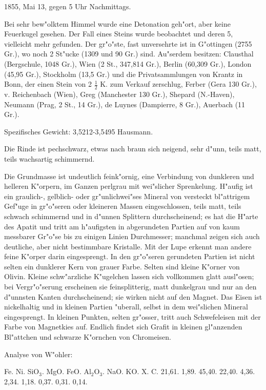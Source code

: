 \documentclass[a4paper, 11pt, oneside]{article}
\begin{document}
1855, Mai 13, gegen 5 Uhr Nachmittags.

Bei sehr bew"olktem Himmel wurde eine Detonation geh"ort, aber keine Feuerkugel gesehen. Der Fall eines Steins wurde beobachtet und deren 5, vielleicht mehr gefunden. Der gr"o"ste, fast unversehrte ist in G"ottingen (2755 Gr.), wo noch 2 St"ucke (1309 und 90 Gr.) sind. Au"serdem besitzen: Clausthal (Bergschule, 1048 Gr.), Wien (2 St., 347,814 Gr.), Berlin (60,309 Gr.), London (45,95 Gr.), Stockholm (13,5 Gr.) und die Privatsammlungen von Krantz in Bonn, der einen Stein von 2 $\frac{1}{2}$ K. zum Verkauf zerschlug, Ferber (Gera 130 Gr.), v. Reichenbach (Wien), Greg (Manchester 130 Gr.), Shepard (N.-Haven), Neumann (Prag, 2 St., 14 Gr.), de Luynes (Dampierre, 8 Gr.), Auerbach (11 Gr.).

Spezifisches Gewicht: 3,5212-3,5495 Hausmann.

Die Rinde ist pechschwarz, etwas nach braun sich neigend, sehr d"unn, teils matt, teils wachsartig schimmernd.

Die Grundmasse ist undeutlich feink"ornig, eine Verbindung von dunkleren und helleren K"orpern, im Ganzen perlgrau mit wei"slicher Sprenkelung. H"aufig ist ein graulich-, gelblich- oder gr"unlichwei"ses Mineral von versteckt bl"attrigem Gef"uge in gr"o"seren oder kleineren Massen eingeschlossen, teils matt, teils schwach schimmernd und in d"unnen Splittern durchscheinend; es hat die H"arte des Apatit und tritt am h"aufigsten in abgerundeten Partien auf von kaum messbarer Gr"o"se bis zu einigen Linien Durchmesser; manchmal zeigen sich auch deutliche, aber nicht bestimmbare Kristalle. Mit der Lupe erkennt man andere feine K"orper darin eingesprengt. In den gr"o"seren gerundeten Partien ist nicht selten ein dunklerer Kern von grauer Farbe. Selten sind kleine K"orner von Olivin. Kleine schw"arzliche K"ugelchen lassen sich vollkommen glatt ausl"osen; bei Vergr"o"serung erscheinen sie feinsplitterig, matt dunkelgrau und nur an den d"unnsten Kanten durchscheinend; sie wirken nicht auf den Magnet. Das Eisen ist nickelhaltig und in kleinen Partien "uberall, selbst in dem wei"slichen Mineral eingesprengt. In kleinen Punkten, selten gr"osser, tritt auch Schwefeleisen mit der Farbe von Magnetkies auf. Endlich findet sich Grafit in kleinen gl"anzenden Bl"attchen und schwarze K"ornchen von Chromeisen.

Analyse von W"ohler:

Fe. Ni. SiO$_{3}$. MgO. FeO. Al$_{2}$O$_{3}$. NaO. KO. X. C.  
21,61. 1,89. 45,40. 22,40. 4,36. 2,34. 1,18. 0,37. 0,31. 0,14.
\end{document}
